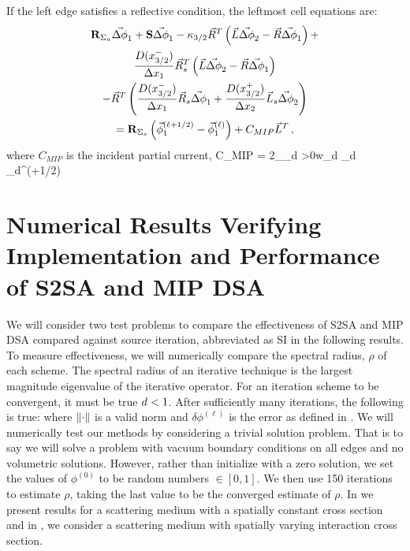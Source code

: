 If the left edge satisfies a reflective condition, the leftmost cell equations are:
\begin{multline}
\mathbf{R}_{\Sigma_a} \vec{\Delta \phi}_1 + \mathbf{S}\vec{\Delta \phi}_1 
-\kappa_{3/2}\vec{R}^T\left( \vec{L} \vec{\Delta \phi}_2 - \vec{R} \vec{\Delta \phi}_1 \right) + \\
\frac{D(x_{3/2}^-)} {\Delta x_1}\vec{R}_s^T \left( \vec{L} \vec{\Delta \phi}_2 - \vec{R} \vec{\Delta \phi}_1 \right) \\
-\vec{R}^T\left( \frac{D(x_{3/2}^-)}{\Delta x_1}\vec{R}_s \vec{\Delta \phi}_1 + \frac{D(x_{3/2}^+)}{\Delta x_2}\vec{L}_s \vec{\Delta \phi}_2 \right)
\\=  \mathbf{R}_{\Sigma_s}\left(  \vec{\phi}^{(\ell+1/2)}_1 - \vec{\phi}^{(\ell)}_1 \right) + C_{MIP} \vec{L}^T\, ,
\end{multline}
where $C_{MIP}$ is the incident partial current,
\benum
C_{MIP} = 2\pi \sum_{\mu_d >0}{w_d \mu_d \psi_d^{(\ell+1/2)} } \pep
\eenum

\section{Numerical Results Verifying Implementation and Performance of S2SA and MIP DSA}
\label{sec:accel_results}

We will consider two test problems to compare the effectiveness of S2SA and MIP DSA compared against source iteration, abbreviated as SI in the following results.
To measure effectiveness, we will  numerically compare the spectral radius, $\rho$ of each scheme.
The spectral radius of an iterative technique is the largest magnitude eigenvalue of the iterative operator.
For an iteration scheme to be convergent, it must be true $ d < 1$.
After sufficiently many iterations, the following is true:
\benum
{} \leq \rho {} \pec
\eenum
where $\left\lVert \cdot \right\rVert$ is a valid norm and $\delta \phi^{(\ell)}$ is the error as defined in .
We will numerically test our methods by considering a trivial solution problem.  
That is to say we will solve a problem with vacuum boundary conditions on all edges and no volumetric solutions.  
However, rather than initialize with a zero solution, we set the values of $\phi^{(0)}$ to be random numbers $\in[0,1]$.
We then use 150 iterations to estimate $\rho$, taking the last value to be the converged estimate of $\rho$.
In  we present results for a scattering medium with a spatially constant cross section and in , we consider a scattering medium with spatially varying interaction cross section.


